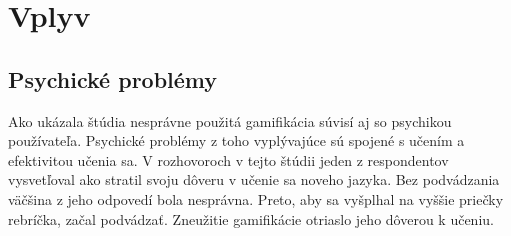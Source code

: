\documentclass[10pt,twoside,slovak,a4paper]{article}
\begin{document}







%



\section{Vplyv} \label{Vplyv}

\subsection{Psychické problémy} \label{Vplyv:Psychické problémy}

Ako ukázala štúdia\cite{HadiMogavi2022} nesprávne použitá gamifikácia súvisí aj so psychikou používateľa. Psychické problémy z toho vyplývajúce sú spojené s učením a efektivitou učenia sa. V rozhovoroch v tejto štúdii jeden z respondentov vysvetľoval ako stratil svoju dôveru v učenie sa noveho jazyka. Bez podvádzania väčšina z jeho odpovedí bola nesprávna. Preto, aby sa vyšplhal na vyššie priečky rebríčka, začal podvádzať. Zneužitie gamifikácie otriaslo jeho dôverou k učeniu. 
\end{document}
